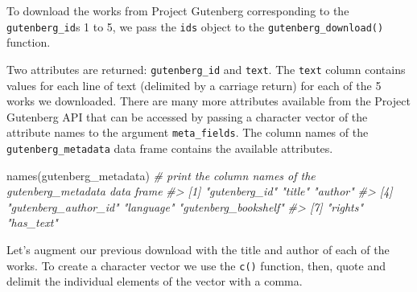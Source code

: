 \documentclass[
]{article}
\newenvironment{Shaded}{\begin{snugshade}}{\end{snugshade}}
\newcommand{\AttributeTok}[1]{\textcolor[rgb]{0.77,0.63,0.00}{#1}}
\newcommand{\CommentTok}[1]{\textcolor[rgb]{0.56,0.35,0.01}{\textit{#1}}}
\newcommand{\FunctionTok}[1]{\textcolor[rgb]{0.00,0.00,0.00}{#1}}
\newcommand{\NormalTok}[1]{#1}
\newcommand{\OtherTok}[1]{\textcolor[rgb]{0.56,0.35,0.01}{#1}}
\begin{document}
To download the works from Project Gutenberg corresponding to the \texttt{gutenberg\_id}s 1 to 5, we pass the \texttt{ids} object to the \texttt{gutenberg\_download()} function.

\begin{Shaded}
\end{Shaded}

Two attributes are returned: \texttt{gutenberg\_id} and \texttt{text}. The \texttt{text} column contains values for each line of text (delimited by a carriage return) for each of the 5 works we downloaded. There are many more attributes available from the Project Gutenberg API that can be accessed by passing a character vector of the attribute names to the argument \texttt{meta\_fields}. The column names of the \texttt{gutenberg\_metadata} data frame contains the available attributes.

\begin{Shaded}
\begin{Highlighting}[]
\FunctionTok{names}\NormalTok{(gutenberg\_metadata)  }\CommentTok{\# print the column names of the \textasciigrave{}gutenberg\_metadata\textasciigrave{} data frame}
\CommentTok{\#\textgreater{} [1] "gutenberg\_id"        "title"               "author"             }
\CommentTok{\#\textgreater{} [4] "gutenberg\_author\_id" "language"            "gutenberg\_bookshelf"}
\CommentTok{\#\textgreater{} [7] "rights"              "has\_text"}
\end{Highlighting}
\end{Shaded}

Let's augment our previous download with the title and author of each of the works. To create a character vector we use the \texttt{c()} function, then, quote and delimit the individual elements of the vector with a comma.
\end{document}
